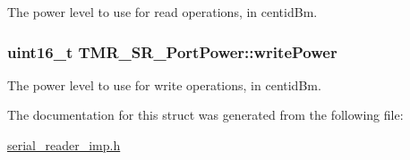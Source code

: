 The power level to use for read operations, in centidBm. \hypertarget{struct_t_m_r___s_r___port_power_b6bc633d14f5eb94000550c4f19c6193}{
\subsubsection[{writePower}]{\setlength{\rightskip}{0pt plus 5cm}uint16\_\-t {\bf TMR\_\-SR\_\-PortPower::writePower}}}
\label{struct_t_m_r___s_r___port_power_b6bc633d14f5eb94000550c4f19c6193}


The power level to use for write operations, in centidBm. 

The documentation for this struct was generated from the following file:\begin{CompactItemize}
\item 
\hyperlink{serial__reader__imp_8h}{serial\_\-reader\_\-imp.h}\end{CompactItemize}
